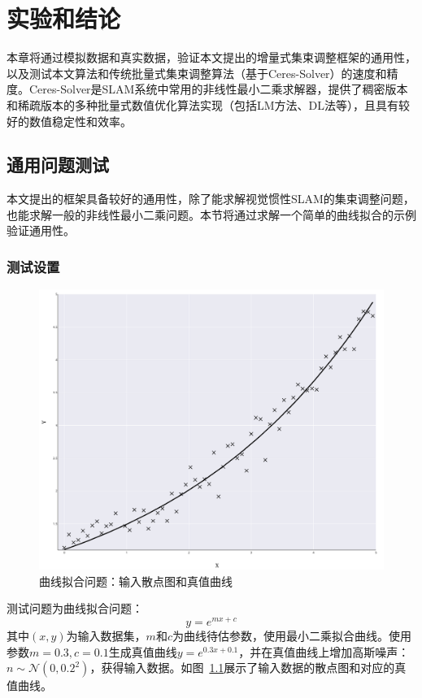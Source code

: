 \chapter{实验和结论}\label{ch:exp}

本章将通过模拟数据和真实数据，验证本文提出的增量式集束调整框架的通用性，以及测试本文算法和传统批量式集束调整算法（基于Ceres-Solver）的速度和精度。Ceres-Solver是SLAM系统中常用的非线性最小二乘求解器，提供了稠密版本和稀疏版本的多种批量式数值优化算法实现（包括LM方法、DL法等），且具有较好的数值稳定性和效率。

\section{通用问题测试}

本文提出的框架具备较好的通用性，除了能求解视觉惯性SLAM的集束调整问题，也能求解一般的非线性最小二乘问题。本节将通过求解一个简单的曲线拟合的示例验证通用性。

\subsection{测试设置}

\begin{figure}[htb!]
    \centering
    \includegraphics[width=.7\textwidth]{Pictures/curse_fitting_gt.png}
    \caption{曲线拟合问题：输入散点图和真值曲线}
    \label{fig:curve_gt}
\end{figure}

测试问题为曲线拟合问题：
\begin{equation}
    y = e^{mx+c}
\end{equation}
其中$(x,y)$为输入数据集，$m$和$c$为曲线待估参数，使用最小二乘拟合曲线。使用参数$m=0.3,c=0.1$生成真值曲线$y=e^{0.3x+0.1}$，并在真值曲线上增加高斯噪声：$n\sim\mathcal{N}(0,0.2^2)$，获得输入数据。如图~\ref{fig:curve_gt}展示了输入数据的散点图和对应的真值曲线。

